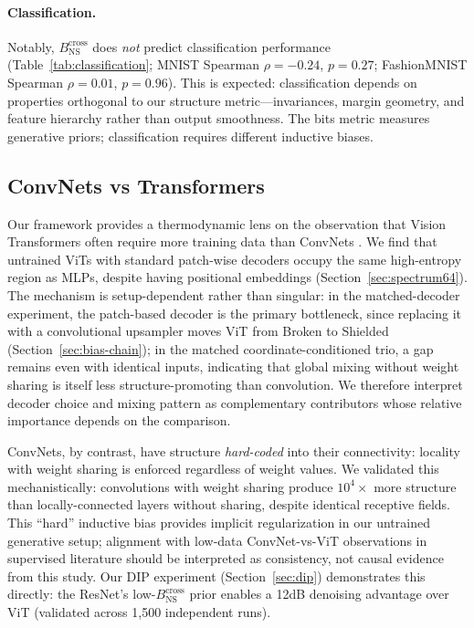 \documentclass{article}
\begin{document}
\paragraph{Classification.} Notably, $B_{\text{NS}}^{\text{cross}}$ does \emph{not} predict classification performance (Table~\ref{tab:classification}; MNIST Spearman $\rho=-0.24$, $p=0.27$; FashionMNIST Spearman $\rho=0.01$, $p=0.96$). This is expected: classification depends on properties orthogonal to our structure metric---invariances, margin geometry, and feature hierarchy rather than output smoothness. The bits metric measures generative priors; classification requires different inductive biases.

\subsection{ConvNets vs Transformers}

Our framework provides a thermodynamic lens on the observation that Vision Transformers often require more training data than ConvNets \cite{steiner2022how}. We find that untrained ViTs with standard patch-wise decoders occupy the same high-entropy region as MLPs, despite having positional embeddings (Section~\ref{sec:spectrum64}). The mechanism is setup-dependent rather than singular: in the matched-decoder experiment, the patch-based decoder is the primary bottleneck, since replacing it with a convolutional upsampler moves ViT from Broken to Shielded (Section~\ref{sec:bias-chain}); in the matched coordinate-conditioned trio, a gap remains even with identical inputs, indicating that global mixing without weight sharing is itself less structure-promoting than convolution. We therefore interpret decoder choice and mixing pattern as complementary contributors whose relative importance depends on the comparison.

ConvNets, by contrast, have structure \emph{hard-coded} into their connectivity: locality with weight sharing is enforced regardless of weight values. We validated this mechanistically: convolutions with weight sharing produce $10^4\times$ more structure than locally-connected layers without sharing, despite identical receptive fields. This ``hard'' inductive bias provides implicit regularization in our untrained generative setup; alignment with low-data ConvNet-vs-ViT observations in supervised literature \cite{steiner2022how} should be interpreted as consistency, not causal evidence from this study. Our DIP experiment (Section~\ref{sec:dip}) demonstrates this directly: the ResNet's low-$B_{\text{NS}}^{\text{cross}}$ prior enables a 12dB denoising advantage over ViT (validated across 1,500 independent runs).
\end{document}
